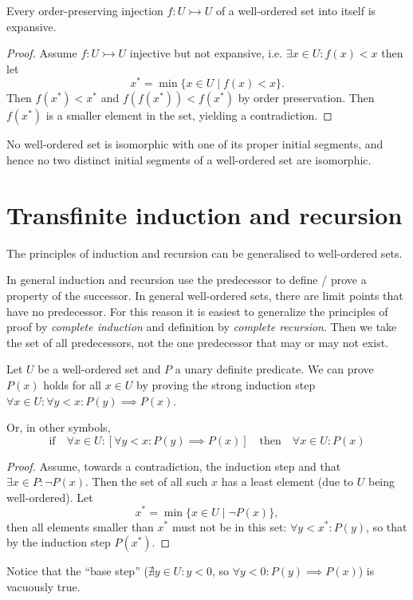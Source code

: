 \begin{proposition} \label{prop:injectionsExpansive}
Every order-preserving injection $f: U\rightarrowtail U$ of a well-ordered set into itself is expansive.
\end{proposition}
\begin{proof}
Assume $f: U\rightarrowtail U$ injective but not expansive, i.e. $\exists x\in U: f(x)<x$ then let
\[ x^* = \min\{x\in U\;|\;f(x)<x\}. \]
Then $f(x^*)<x^*$ and $f(f(x^*)) < f(x^*)$ by order preservation. Then $f(x^*)$ is a smaller element in the set, yielding a contradiction.
\end{proof}
\begin{corollary} \label{corollary:properInitialSegmentNotIsomorphic}
No well-ordered set is isomorphic with one of its proper initial
segments, and hence no two distinct initial segments of a well-ordered set are
isomorphic.
\end{corollary}


\section{Transfinite induction and recursion}
The principles of induction and recursion can be generalised to well-ordered sets.

In general induction and recursion use the predecessor to define / prove a property of the successor. In general well-ordered sets, there are limit points that have no predecessor. For this reason it is easiest to generalize the principles of proof by \textit{complete
induction} and definition by \textit{complete recursion}. Then we take the set of all predecessors, not the one predecessor that may or may not exist.

\begin{theorem}
Let $U$ be a well-ordered set and $P$ a unary definite predicate. We can prove $P(x)$ holds for all $x\in U$ by proving the strong induction step $\forall x\in U: \forall y<x: P(y)\implies P(x)$.

Or, in other symbols,
\[ \text{if}\quad  \forall x\in U: \left[\forall y < x: P(y)\implies P(x)\right] \quad \text{then}\quad \forall x\in U: P(x) \]
\end{theorem}
\begin{proof}
Assume, towards a contradiction, the induction step and that $\exists x\in P: \neg P(x)$. Then the set of all such $x$ has a least element (due to $U$ being well-ordered). Let
\[ x^* = \min\{ x\in U\;|\; \neg P(x) \}, \]
then all elements smaller than $x^*$ must not be in this set: $\forall y<x^*: P(y)$, so that by the induction step $P(x^*)$.
\end{proof}
Notice that the ``base step'' ($\nexists y\in U: y<0$, so $\forall y<0: P(y)\implies P(x)$) is vacuously true.

